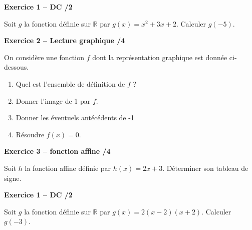 \documentclass[10pt,a4paper]{article}
\begin{document}
\begin{sujets}


\textbf{Exercice 1 -- DC \hfill /2}

Soit \(g\) la fonction définie sur \(\mathbb{R}\) par \(g(x)=x^2+3x+2\). Calculer \(g(-5)\).

\vspace{0.1cm}

\textbf{Exercice 2 -- Lecture graphique \hfill /4}

On considère une fonction \(f\) dont la représentation graphique est donnée ci-dessous.
\begin{enumerate}
\item Quel est l'ensemble de définition de \(f\) ?
\item Donner l'image de 1 par \(f\).
\item Donner les éventuels antécédents de -1
\item Résoudre \(f(x)=0\).
\end{enumerate}

\begin{center}
\end{center}

\textbf{Exercice 3 -- fonction affine \hfill /4}

Soit \(h\) la fonction affine définie par \(h(x)=2x+3\). Déterminer son tableau de signe.

\columnbreak


\textbf{Exercice 1 -- DC \hfill /2}

Soit \(g\) la fonction définie sur \(\mathbb{R}\) par \(g(x)=2(x-2)(x+2)\). Calculer \(g(-3)\).


\end{sujets}
\end{document}
